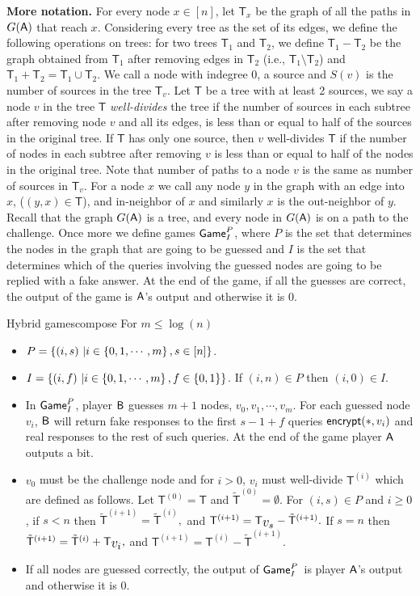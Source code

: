 \documentclass{article}
\def\B{{\sf B}}
\def\A{{\sf A}}
\newcommand{\encrypt}{{\sf encrypt}}
\newcommand{\game}{{\sf Game}}
\newcommand{\T}{{\mathsf T}}
\newcommand{\gpi}{$\game^P_I$}
\newcommand{\dT}{{\mathsf{T}}}
\newcommand{\bigv}[1]{\mbox{\large $v_{#1}$}}
\newcommand{\bigt}[1]{{\dT}^{({#1})}}
\newcommand{\bigtb}[1]{\tilde{\dT}^{({#1})}}
\begin{document}
  \textbf{More notation.} For every node $x\in [n]$, let $\T_x$ be the graph of all the paths in $G(\A)$ that reach $x$. Considering every tree as the set of its edges, we define the following operations on trees: for two trees $\T_1$ and $\T_2$, we define $\T_1-\T_2$ be the graph obtained from $\T_1$ after removing edges in $\T_2$ (i.e., $ \T_1\setminus \T_2 $) and $\T_1+\T_2 = \T_1\cup \T_2$.  We call a node with indegree 0, a source and $S(v)$ is the number of sources in the tree $\T_v$.  Let $\T$ be a tree with at least 2 sources, we say a node $v$ in the tree $\T$ \textit{well-divides} the tree if the number of sources in each subtree after removing node $v$ and all its edges, is less than or equal to half of the sources in the original tree. If $\T$ has only one source, then $v$ well-divides $\T$ if the number of nodes in each subtree after removing $v$ is less than or equal to half of the nodes in the original tree. Note that number of paths to a node $v$ is the same as number of sources in $\T_v$. For a node $x$ we call any node $y$ in the graph with an edge into $x$, ($(y,x)\in \T$), and in-neighbor of $x$ and similarly $x$ is the out-neighbor of $y$.\\
  

  Recall that the graph $G(\A)$ is a tree, and every node in $G(\A)$ is on a path to the challenge. Once more we define games \gpi, where $P$ is the set that determines the nodes in the graph that are going to be guessed and $I$ is the set that determines which of the queries involving the guessed nodes are going to be replied with a fake answer. At the end of the game, if all the guesses are correct, the output of the game is $\A$'s output and otherwise it is 0.\\
\begin{boxfig}{Hybrid games}{compose}
For $m\leq \log (n)$
\begin{itemize}
  \item $P=\left\{ (i,s)\ | i \in \left\{ 0,1,\cdots,m \right\}, s\in [n] \right\} $.
  \item $I=\left\{ (i,f)\ | i \in \left\{ 0,1,\cdots,m \right\}, f\in \{0,1\} \right\}$. If $(i,n)\in P$ then $(i,0) \in I$. 
  \item In \gpi, player $\B$ guesses $m+1$ nodes, $v_0,v_1,\cdots,v_m$. For each guessed node $v_i$, $\B$ will return fake responses to the first $s-1+f$ queries $\encrypt(*,v_i)$ and real responses to the rest of such queries. At the end of the game player $\A$ outputs a bit.
 \item $v_0$ must be the challenge node and for $i>0$, $v_i$ must well-divide $\bigt{i}$ which are defined as follows. Let $\bigt{0}=\T$ and $\bigtb{0}=\emptyset$. For $(i,s)\in P$ and $i\geq 0$, if $s<n$ then $\bigtb{i+1}=\bigtb{i},$ and $\bigt{i+1}=\T_{\bigv{s}}-\bigtb{i+1}.$ If $s=n$ then $\bigtb{i+1}=\bigtb{i}+\T_{\bigv{i}},$ and $\bigt{i+1}=\bigt{i}- \bigtb{i+1}.$
\item If all nodes are guessed correctly, the output of \gpi~is player $\A$'s output and otherwise it is 0.
\end{itemize}
\end{boxfig}
\end{document}
